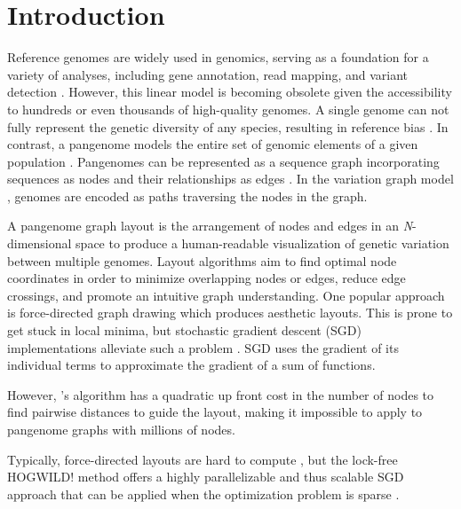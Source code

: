 \documentclass{bioinfo}
\theoremstyle{definition}
\begin{document}
	\section{Introduction}
	Reference genomes are widely used in genomics, serving as a foundation for a variety of analyses, including gene annotation, read mapping, and variant detection \citep{Singh2022}.
	However, this linear model is becoming obsolete given the accessibility to hundreds or even thousands of high-quality genomes.
	A single genome can not fully represent the genetic diversity of any species, resulting in reference bias \citep{Ballouz2019}.
	In contrast, a pangenome models the entire set of genomic elements of a given population \citep{Tettelin_2008,cpang2018,Eizenga_2020, Sherman_2020}.
	Pangenomes can be represented as a sequence graph incorporating sequences as nodes and their relationships as edges \citep{Hein1989}.
	In the variation graph model \citep{Garrison:2018}, genomes are encoded as paths traversing the nodes in the graph.
	
	A pangenome graph layout is the arrangement of nodes and edges in an \textit{N}-dimensional space to produce a human-readable visualization of genetic variation between multiple genomes.
	Layout algorithms aim to find optimal node coordinates in order to minimize overlapping nodes or edges, reduce edge crossings, and promote an intuitive graph understanding.
	One popular approach is force-directed graph drawing \citep{cheong_force-directed_2022} which produces aesthetic layouts.
	This is prone to get stuck in local minima, but stochastic gradient descent (SGD) implementations alleviate such a problem \citep{Zheng2019}.
	SGD uses the gradient of its individual terms to approximate the gradient of a sum of functions. 
	
	However, \cite{Zheng2019}'s algorithm has a quadratic up front cost in the number of nodes to find pairwise distances to guide the layout, making it impossible to apply to pangenome graphs with millions of nodes. 
	
	Typically, force-directed layouts are hard to compute \citep{wang_research_2014}, but the lock-free HOGWILD! method offers a highly parallelizable and thus scalable SGD approach that can be applied when the optimization problem is sparse \citep{Recht2011}.
	
\end{document}
